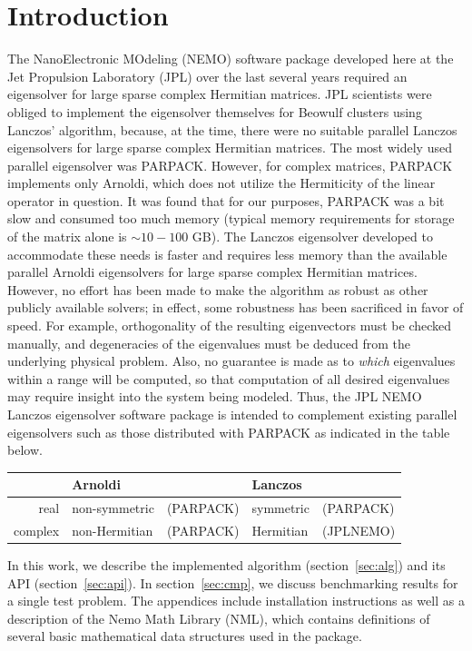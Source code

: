 \documentclass[twoside,12pt]{article}
\begin{document}
\section{Introduction}
The NanoElectronic MOdeling (NEMO) software package developed here
at the Jet Propulsion Laboratory (JPL) over the last several years
required an eigensolver for large sparse complex Hermitian matrices.
JPL scientists were obliged to implement the eigensolver themselves
for Beowulf clusters using Lanczos' algorithm, because, at the time,
there were no suitable parallel Lanczos eigensolvers
for large sparse complex Hermitian matrices.
The most widely used parallel eigensolver was PARPACK\cite{ARPACK, www:arpack}.
However, for complex matrices, PARPACK implements only Arnoldi, which
does not utilize the Hermiticity of the linear operator in question.
It was found that for our purposes, PARPACK was a bit slow 
and consumed too much memory (typical memory requirements 
for storage of the matrix alone is $\sim 10-100$ GB).
The Lanczos eigensolver developed to accommodate these needs
is faster and requires less memory than the available parallel 
Arnoldi eigensolvers for large sparse complex Hermitian matrices.
However, no effort has been made to make the algorithm as robust
as other publicly available solvers; in effect, 
some robustness has been sacrificed in favor of speed.
For example, orthogonality of the resulting eigenvectors must be 
checked manually, and degeneracies of the eigenvalues must be deduced 
from the underlying physical problem.
Also, no guarantee is made as to \emph{which} eigenvalues within
a range will be computed, so that computation of all desired
eigenvalues may require insight into the system being modeled.
Thus, the JPL NEMO Lanczos eigensolver software package
is intended to complement existing parallel eigensolvers such as those 
distributed with PARPACK as indicated in the table below.
%
\begin{center}
\begin{tabular}{r|ll|ll}
	&Arnoldi	&		&Lanczos	&		\\
\hline
real	&non-symmetric	&(PARPACK)	&symmetric	&(PARPACK)	\\
complex	&non-Hermitian	&(PARPACK)	&Hermitian	&(JPLNEMO)
\end{tabular}
\end{center}
%
In this work, we describe the implemented algorithm (section~\ref{sec:alg})
and its API (section~\ref{sec:api}).  In section~\ref{sec:cmp},
we discuss benchmarking results for a single test problem.  
The appendices include installation instructions as well
as a description of the Nemo Math Library (NML), which contains
definitions of several basic mathematical data structures used in
the package.
\end{document}
